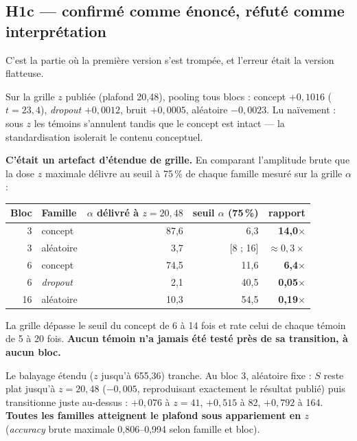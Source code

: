 \documentclass[a4paper,10pt]{article}
\newcommand{\pc}[1]{#1\,\%}
\begin{document}
\subsection{H1c --- confirmé comme énoncé, réfuté comme interprétation}

C'est la partie où la première version s'est trompée, et l'erreur était la version flatteuse.

Sur la grille $z$ publiée (plafond 20,48), pooling tous blocs : concept $+0{,}1016$
($t = 23{,}4$), \emph{dropout} $+0{,}0012$, bruit $+0{,}0005$, aléatoire $-0{,}0023$. Lu naïvement :
sous $z$ les témoins s'annulent tandis que le concept est intact --- la standardisation isolerait le
contenu conceptuel.

\textbf{C'était un artefact d'étendue de grille.} En comparant l'amplitude brute que la dose $z$
maximale délivre au seuil à \pc{75} de chaque famille mesuré sur la grille $\alpha$ :

\begin{center}\small
\begin{tabular}{rlrrr}
\toprule
Bloc & Famille & $\alpha$ délivré à $z = 20{,}48$ & seuil $\alpha$ (\pc{75}) & rapport \\
\midrule
3  & concept        & 87,6 & 6,3  & \textbf{14,0$\times$} \\
3  & aléatoire      & 3,7  & [8 ; 16] & \textbf{${\approx}0{,}3\times$} \\
6  & concept        & 74,5 & 11,6 & \textbf{6,4$\times$} \\
6  & \emph{dropout} & 2,1  & 40,5 & \textbf{0,05$\times$} \\
16 & aléatoire      & 10,3 & 54,5 & \textbf{0,19$\times$} \\
\bottomrule
\end{tabular}
\end{center}

La grille dépasse le seuil du concept de 6 à 14 fois et rate celui de chaque témoin de 5 à 20 fois.
\textbf{Aucun témoin n'a jamais été testé près de sa transition, à aucun bloc.}

Le balayage étendu ($z$ jusqu'à 655,36) tranche. Au bloc 3, aléatoire fixe : $S$ reste plat jusqu'à
$z = 20{,}48$ ($-0{,}005$, reproduisant exactement le résultat publié) puis transitionne juste
au-dessus : $+0{,}076$ à $z = 41$, $+0{,}515$ à 82, $+0{,}792$ à 164. \textbf{Toutes les familles
atteignent le plafond sous appariement en $z$} (\emph{accuracy} brute maximale 0,806--0,994 selon
famille et bloc).
\end{document}
